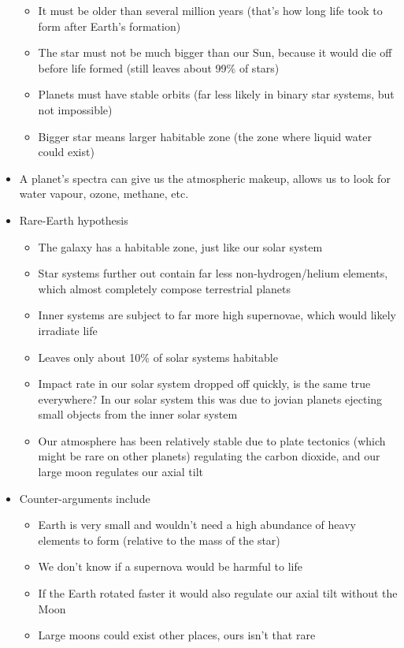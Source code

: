 \documentclass[12pt]{article}
\begin{document}
\begin{itemize}
\begin{itemize}
\item It must be older than several million years (that's how long life took to form after Earth's formation)
\item The star must not be much bigger than our Sun, because it would die off before life formed (still leaves about 99\% of stars)
\item Planets must have stable orbits (far less likely in binary star systems, but not impossible)
\item Bigger star means larger habitable zone (the zone where liquid water could exist)
\end{itemize}
\item A planet's spectra can give us the atmospheric makeup, allows us to look for water vapour, ozone, methane, etc.
\item Rare-Earth hypothesis
\begin{itemize}
\item The galaxy has a habitable zone, just like our solar system
\item Star systems further out contain far less non-hydrogen/helium elements, which almost completely compose terrestrial planets
\item Inner systems are subject to far more high supernovae, which would likely irradiate life
\item Leaves only about 10\% of solar systems habitable
\item Impact rate in our solar system dropped off quickly, is the same true everywhere?  In our solar system this was due to jovian planets ejecting small objects from the inner solar system
\item Our atmosphere has been relatively stable due to plate tectonics (which might be rare on other planets) regulating the carbon dioxide, and our large moon regulates our axial tilt
\end{itemize}
\item Counter-arguments include
\begin{itemize}
\item Earth is very small and wouldn't need a high abundance of heavy elements to form (relative to the mass of the star)
\item We don't know if a supernova would be harmful to life
\item If the Earth rotated faster it would also regulate our axial tilt without the Moon
\item Large moons could exist other places, ours isn't that rare

\end{itemize}
\end{itemize}
\end{document}
